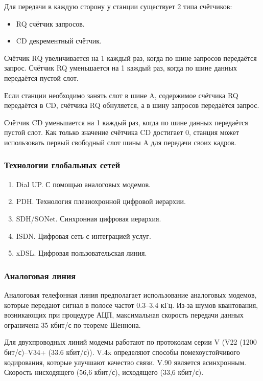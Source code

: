 \documentclass[12pt, russian, oneside, article]{ncc}
\begin{document}
\begin{itemize}
Для передачи в каждую сторону у станции существует 2 типа счётчиков:
\begin{itemize}
\item RQ счётчик запросов.
\item CD декрементный счётчик.
\end{itemize}

Счётчик RQ увеличивается на 1 каждый раз, когда по шине запросов передаётся запрос. Счётчик RQ уменьшается на 1 каждый раз, когда по шине данных передаётся пустой слот.

Если станции необходимо занять слот в шине A, содержимое счётчика RQ передаётся в CD, счётчика RQ обнуляется, а в шину запросов передаётся запрос.

Счётчик CD уменьшается на 1 каждый раз, когда по шине данных передаётся пустой слот. Как только значение счётчика CD достигает 0, станция может использовать первый свободный слот шины A для передачи своих кадров.

\end{itemize} %
\subsubsection{Технологии глобальных сетей}
\label{sec-5_2_5}


\begin{enumerate}
\item Dial UP. С помощью аналоговых модемов.
\item PDH. Технология плезиохронной цифровой иерархии.
\item SDH/SONet. Синхронная цифровая иерархия.
\item ISDN. Цифровая сеть с интеграцией услуг.
\item xDSL. Цифровая пользовательская линия.
\end{enumerate}
\subsubsection{Аналоговая линия}
\label{sec-5_2_6}


Аналоговая телефонная линия предполагает использование аналоговых модемов, которые передают сигнал в полосе частот 0.3--3.4 кГц. Из-за шумов квантования, возникающих при процедуре АЦП, максимальная скорость передачи данных ограничена 35 кбит/с по теореме Шеннона.

Для двухпроводных линий модемы работают по протоколам серии V (V22 (1200 бит/с)--V34+ (33.6 кбит/с)). V.4x определяют способы помехоустойчивого кодирования, которые улучшают качество связи. V.90 является асинхронным. Скорость нисходящего (56,6 кбит/с), исходящего (33,6 кбит/с).
\end{document}
